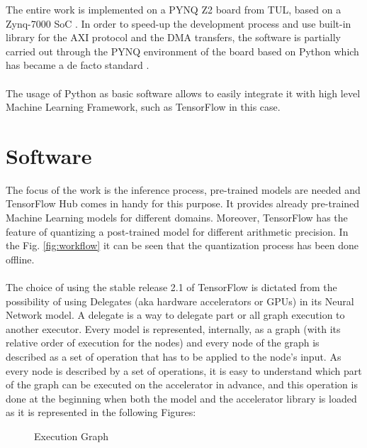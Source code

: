 \newpage
The entire work is implemented on a PYNQ Z2 board from TUL, based on a Zynq-7000 SoC \cite{paper:31}. In order to speed-up the development process and use built-in library for the AXI protocol and the DMA transfers, the software is partially carried out through the PYNQ environment of the board \cite{WEBSITE:2} based on Python which has became a de facto standard \cite{paper:37}. \\\\
The usage of Python as basic software allows to easily integrate it with high level Machine Learning Framework, such as TensorFlow in this case. 
\newpage
\section{Software}

The focus of the work is the inference process, pre-trained models are needed and TensorFlow Hub \cite{WEBSITE:5} comes in handy for this purpose. It provides already pre-trained Machine Learning models for different domains. Moreover, TensorFlow has the feature of quantizing a post-trained model for different arithmetic precision. In the Fig. \ref{fig:workflow} it can be seen that the quantization process has been done offline.\\\\
The choice of using the stable release 2.1 of TensorFlow is dictated from the possibility of using Delegates (aka hardware accelerators or GPUs) in its Neural Network model. A delegate is a way to delegate part or all graph execution to another executor. Every model is represented, internally, as a graph (with its relative order of execution for the nodes) and every node of the graph is described as a set of operation that has to be applied to the node's input. As every node is described by a set of operations, it is easy to understand which part of the graph can be executed on the accelerator in advance, and this operation is done at the beginning when both the model and the accelerator library is loaded as it is represented in the following Figures:
\begin{figure}[!htbp]
\captionsetup{justification=centering}
    \centering
    \qquad
    \centering
    \caption{Execution Graph}%
    \label{fig:execgraph}%
\end{figure}

